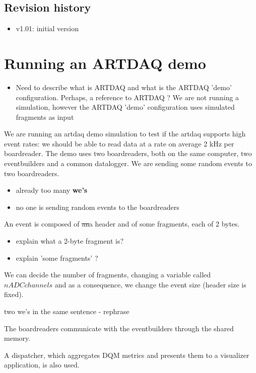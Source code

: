 \documentclass[12pt]{article}
\newcommand {\add}[1]    {{\red #1}}
\newcommand {\del}[1]    {{\blue \sout{#1}}}
\newcommand {\red}       {\color{red}}
\newcommand {\blue}      {\color{blue}}
\begin{document}
\subsection {Revision history} 
\begin{itemize}
\item
  v1.01: initial version
\end{itemize}
\newpage
\section{Running an ARTDAQ demo}
\begin{itemize}
\item 
\add{
  Need to describe what is ARTDAQ and what is the ARTDAQ 'demo' configuration.
  Perhaps, a reference to ARTDAQ ?
  We are not running a simulation, however the ARTDAQ 'demo' configuration
  uses simulated fragments as input 
}
\end{itemize}

We are running an artdaq demo simulation to test if the artdaq supports high event rates: we should be able to read data at a rate on average 2 kHz per boardreader. The demo uses two boardreaders, both on the same computer, two eventbuilders and a common datalogger. We are sending some random events to two boardreaders.

\begin{itemize}
\item 
  already too many {\bf we's}
\item 
  no one is sending random events to the boardreaders
\end{itemize}

An event is composed of \del{an}\add{a} header and of some fragments, each of 2 bytes.
\add{
\begin{itemize}
\item
  explain what a 2-byte fragment is? 
\item
  explain 'some fragments' ?
\end{itemize}
}

We can decide the number of fragments, changing a variable called $nADCchannels$ and as a consequence, we change the event size (header size is fixed).

\add{two we's in the same sentence - rephrase} 

The boardreaders communicate with the eventbuilders through the shared memory.

A dispatcher, which aggregates DQM metrics and presents them to a visualizer application, is also used.
\end{document}
